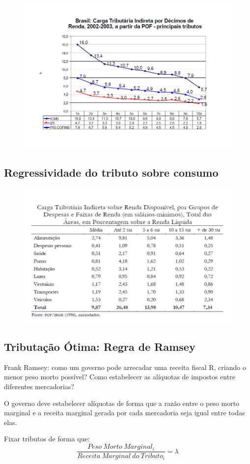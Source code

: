 \documentclass[a4paper,12pt]{article}[abntex2]
\begin{document}
\begin{figure}[H]
    \centering
    \includegraphics[width=0.7\linewidth]{Imagens/a18i10.png}
\end{figure}

\subsection{\textbf{Regressividade do tributo sobre consumo}}
\begin{figure}[H]
    \centering
    \includegraphics[width=0.7\linewidth]{Imagens/a18i11.png}
\end{figure}

\subsection{\textbf{Tributação Ótima: Regra de Ramsey}}
Frank Ramsey: como um governo pode arrecadar uma receita fiscal R, criando o menor peso morto possível? Como estabelecer as alíquotas de impostos entre diferentes mercadorias?

O governo deve estabelecer alíquotas de forma que a razão entre o peso morto marginal e a receita marginal gerada por cada mercadoria seja igual entre todas elas.

Fixar tributos de forma que:
\[
\frac{Peso\ Morto\ Marginal_i}{Receita\ Marginal\ do\ Tributo_i} = \lambda
\]
\end{document}
